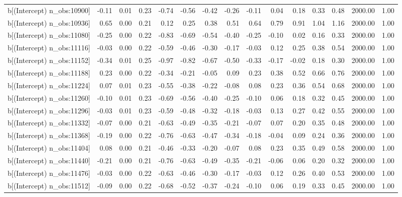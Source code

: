 \begin{table}[ht]
\begin{tabular}{rrrrrrrrrrrrrrr}
  b[(Intercept) n\_obs:10900] & -0.11 & 0.01 & 0.23 & -0.74 & -0.56 & -0.42 & -0.26 & -0.11 & 0.04 & 0.18 & 0.33 & 0.48 & 2000.00 & 1.00 \\ 
  b[(Intercept) n\_obs:10936] & 0.65 & 0.00 & 0.21 & 0.12 & 0.25 & 0.38 & 0.51 & 0.64 & 0.79 & 0.91 & 1.04 & 1.16 & 2000.00 & 1.00 \\ 
  b[(Intercept) n\_obs:11080] & -0.25 & 0.00 & 0.22 & -0.83 & -0.69 & -0.54 & -0.40 & -0.25 & -0.10 & 0.02 & 0.16 & 0.33 & 2000.00 & 1.00 \\ 
  b[(Intercept) n\_obs:11116] & -0.03 & 0.00 & 0.22 & -0.59 & -0.46 & -0.30 & -0.17 & -0.03 & 0.12 & 0.25 & 0.38 & 0.54 & 2000.00 & 1.00 \\ 
  b[(Intercept) n\_obs:11152] & -0.34 & 0.01 & 0.25 & -0.97 & -0.82 & -0.67 & -0.50 & -0.33 & -0.17 & -0.02 & 0.18 & 0.30 & 2000.00 & 1.00 \\ 
  b[(Intercept) n\_obs:11188] & 0.23 & 0.00 & 0.22 & -0.34 & -0.21 & -0.05 & 0.09 & 0.23 & 0.38 & 0.52 & 0.66 & 0.76 & 2000.00 & 1.00 \\ 
  b[(Intercept) n\_obs:11224] & 0.07 & 0.01 & 0.23 & -0.55 & -0.38 & -0.22 & -0.08 & 0.08 & 0.23 & 0.36 & 0.54 & 0.68 & 2000.00 & 1.00 \\ 
  b[(Intercept) n\_obs:11260] & -0.10 & 0.01 & 0.23 & -0.69 & -0.56 & -0.40 & -0.25 & -0.10 & 0.06 & 0.18 & 0.32 & 0.45 & 2000.00 & 1.00 \\ 
  b[(Intercept) n\_obs:11296] & -0.03 & 0.01 & 0.23 & -0.59 & -0.48 & -0.32 & -0.18 & -0.03 & 0.13 & 0.27 & 0.42 & 0.55 & 2000.00 & 1.00 \\ 
  b[(Intercept) n\_obs:11332] & -0.07 & 0.00 & 0.21 & -0.63 & -0.49 & -0.35 & -0.21 & -0.07 & 0.07 & 0.20 & 0.35 & 0.48 & 2000.00 & 1.00 \\ 
  b[(Intercept) n\_obs:11368] & -0.19 & 0.00 & 0.22 & -0.76 & -0.63 & -0.47 & -0.34 & -0.18 & -0.04 & 0.09 & 0.24 & 0.36 & 2000.00 & 1.00 \\ 
  b[(Intercept) n\_obs:11404] & 0.08 & 0.00 & 0.21 & -0.46 & -0.33 & -0.20 & -0.07 & 0.08 & 0.23 & 0.35 & 0.49 & 0.58 & 2000.00 & 1.00 \\ 
  b[(Intercept) n\_obs:11440] & -0.21 & 0.00 & 0.21 & -0.76 & -0.63 & -0.49 & -0.35 & -0.21 & -0.06 & 0.06 & 0.20 & 0.32 & 2000.00 & 1.00 \\ 
  b[(Intercept) n\_obs:11476] & -0.03 & 0.00 & 0.22 & -0.63 & -0.46 & -0.30 & -0.17 & -0.03 & 0.12 & 0.26 & 0.40 & 0.53 & 2000.00 & 1.00 \\ 
  b[(Intercept) n\_obs:11512] & -0.09 & 0.00 & 0.22 & -0.68 & -0.52 & -0.37 & -0.24 & -0.10 & 0.06 & 0.19 & 0.33 & 0.45 & 2000.00 & 1.00 \\ 

\end{tabular}
\end{table}

